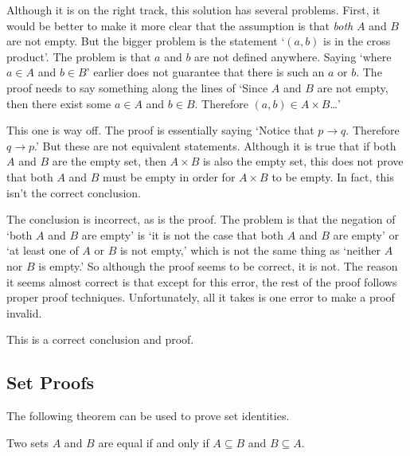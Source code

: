 \begin{eval}
\begin{ssolenum}
\noindent
\evallinetwo
\end{ssolenum}
\begin{answer}
\begin{solevalenum}
\item
Although it is on the right track, this solution has several problems.  First, it would be better to make
it more clear that the assumption is that {\em both} $A$ and $B$ are not empty.  
But the bigger problem is the statement `$(a,b)$ is in the cross product'.  
The problem is that $a$ and $b$ are not defined anywhere.
Saying `where $a\in A$ and $b\in B$' earlier does not guarantee that there is such an $a$ or $b$.  
The proof needs to say something along the lines of 
`Since $A$ and $B$ are not empty, then there exist some $a\in A$ and $b\in B$.  Therefore
$(a,b)\in A\times B$\ldots'
\item
This one is way off.  The proof is essentially saying 
`Notice that $p\rightarrow q$. Therefore $q\rightarrow p$.'  But these are not equivalent
statements.  Although it is true that if both $A$ and $B$ are the empty set, then $A\times B$ is
also the empty set, this does not prove that both $A$ and $B$ must be empty in order for $A\times B$
to be empty.  In fact, this isn't the correct conclusion.
\item
The conclusion is incorrect, as is the proof.
The problem is that the negation of
`both $A$ and $B$ are empty' is `it is not the case that both $A$ and $B$ are empty' 
or `at least one of $A$ or $B$ is not empty,' which is not the same thing as
`neither $A$ nor $B$  is empty.'  So although the proof seems to be correct, it is not.
The reason it seems almost correct is that except for this error, the rest of the proof follows
proper proof techniques.  Unfortunately, all it takes is one error to make a proof invalid.
\item
This is a correct conclusion and proof.
\end{solevalenum}
\end{answer}
\end{eval}

\newpage
\subsection{Set Proofs}\label{section:setProofs}


The following theorem can be used to prove set identities.

\begin{thm}\label{sets:containtmentproof}
Two sets $A$ and $B$ are equal if and only if  $A \subseteq
B$ and $B \subseteq A.$
\end{thm}

